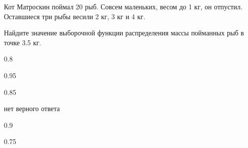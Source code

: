 
\begin{question}
Кот Матроскин поймал 20 рыб. Совсем маленьких, весом до 1 кг, он
отпустил. Оставшиеся три рыбы весили 2 кг, 3 кг и 4 кг.

Найдите значение выборочной функции распределения массы пойманных рыб в
точке 3.5 кг.
\begin{answerlist}
  \item 0.8
  \item 0.95
  \item 0.85
  \item нет верного ответа
  \item 0.9
  \item 0.75
\end{answerlist}
\end{question}


